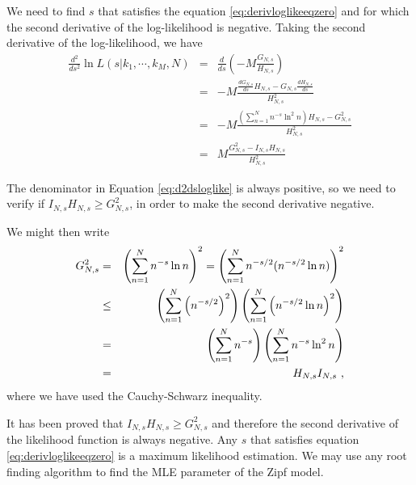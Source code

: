 We need to find $s$ that satisfies the equation \ref{eq:derivloglikeeqzero} and for which the second
derivative of the log-likelihood is negative. Taking the second derivative of the log-likelihood, we have
\begin{eqnarray}
\label{eq:d2dsloglike}
\frac{d^2}{ds^2} \ln L(s|k_1,\cdots,k_M,N) &=& \frac{d}{ds} \left( -M \frac{G_{N,s}}{H_{N,s}} \right) \nonumber \\
	&=& -M \frac{ \frac{d G_{N,s}}{ds} H_{N,s} - G_{N,s} \frac{d H_{N,s}}{ds} }{H_{N,s}^2} \nonumber \\
	&=& -M \frac{ \left( \sum_{n=1}^{N} n^{-s} \ln^2 n \right) H_{N,s} - G_{N,s}^2 } {H_{N,s}^2} \nonumber \\
	&=&  M \frac{  G_{N,s}^2 - I_{N,s} H_{N,s}  } {H_{N,s}^2}
\end{eqnarray}

The denominator in Equation \ref{eq:d2dsloglike} is always positive, so we need to verify if $I_{N,s} H_{N,s} \geq G_{N,s}^2$,
in order to make the second derivative negative.

We might then write
\begin{eqnarray}
\label{eq:GNs_cauchy}
G_{N,s}^2 &=&     \left( \sum_{n=1}^{N} n^{-s} \ln n  \right)^2 = \left( \sum_{n=1}^{N} n^{-s/2} (n^{-s/2} \ln n)  \right)^2 \nonumber \\
          &\leq&  \left( \sum_{n=1}^{N} \left( n^{-s/2} \right)^2 \right)    \left( \sum_{n=1}^{N} \left( n^{-s/2} \ln n \right)^2 \right) \nonumber \\
          &=& \left( \sum_{n=1}^{N} n^{-s} \right)    \left( \sum_{n=1}^{N} n^{-s} \ln^2 n \right) \nonumber \\
          &=&  H_{N,s}  I_{N,s} \textmd{ ,} 
\end{eqnarray}
where we have used the Cauchy-Schwarz inequality.


It has been proved that  $I_{N,s} H_{N,s} \geq G_{N,s}^2$ and therefore the second derivative of the likelihood function is always negative.
Any $s$ that satisfies equation \ref{eq:derivloglikeeqzero} is a maximum likelihood estimation.
We may use any root finding algorithm to find the MLE parameter of the Zipf model.

